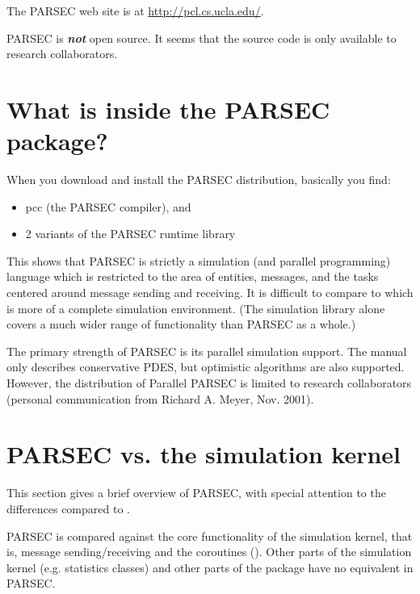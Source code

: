 The PARSEC web site is at \href{http://pcl.cs.ucla.edu/}{http://pcl.cs.ucla.edu/}.


PARSEC is \textbf{\textit{not}} open source. It seems that the source code 
is only available to research collaborators.





\section{What is inside the PARSEC package?}

When you download and install the PARSEC distribution, basically 
you find:
\begin{itemize}
\item{pcc (the PARSEC compiler), and}
\item{2 variants of the PARSEC runtime library}
\end{itemize}


This shows that PARSEC is strictly a simulation (and parallel 
programming) language which is restricted to the area of entities, 
messages, and the tasks centered around message sending and receiving. 
It is difficult to compare to {\opp} which is more of a complete 
simulation environment. (The {\opp} simulation library alone 
covers a much wider range of functionality than PARSEC as a whole.)


The primary strength of PARSEC is its parallel simulation support. 
The manual only describes conservative PDES, but optimistic algorithms 
are also supported. However, the distribution of Parallel PARSEC 
is limited to research collaborators (personal communication 
from Richard A. Meyer, Nov. 2001).





\section{PARSEC vs. the {\opp} simulation kernel}

This section gives a brief overview of PARSEC, with special attention 
to the differences compared to {\opp}.

PARSEC is compared against the core functionality of the {\opp} 
simulation kernel, that is, message sending/receiving and the 
coroutines (). Other parts of the {\opp} simulation 
kernel (e.g. statistics classes) and other parts of the {\opp} 
package have no equivalent in PARSEC.



